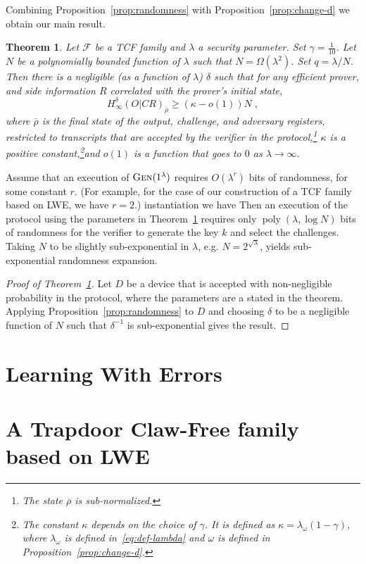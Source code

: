 \documentclass[11pt]{article}
\newtheorem{theorem}{Theorem}
\theoremstyle{remark}
\theoremstyle{definition}
\newcommand{\ol}[1]{\overline{#1}}
\DeclareMathOperator{\poly}{poly}
\newcommand{\Gen}{\textsc{Gen}}
\newcommand{\Hmin}{H_\infty}
\begin{document}
Combining Proposition~\ref{prop:randomness} with Proposition~\ref{prop:change-d} we obtain our main result.


\begin{theorem}\label{thm:expansion}
Let $\mathcal{F}$ be a TCF family and $\lambda$ a security parameter. Set $\gamma = \frac{1}{10}$. Let $N$ be a polynomially bounded function of $\lambda$ such that $N = \Omega(\lambda^2)$. Set $q = \lambda/N$. Then there is a negligible (as a function of $\lambda$) $\delta$ such that for any efficient prover, and side information $R$ correlated with the prover's initial state,
$$\Hmin^{\delta}(O|CR)_{\ol{\rho}} \geq  (\kappa-o(1)) N\;,$$
where $\ol{\rho}$ is the final state of the output, challenge, and adversary registers, restricted to transcripts that are accepted by the verifier in the protocol,\footnote{The state $\ol{\rho}$ is sub-normalized.} $\kappa$ is a positive constant,\footnote{The constant $\kappa$ depends on the choice of $\gamma$. It is defined as $\kappa =\lambda_\omega(1-\gamma)$, where $\lambda_\omega$ is defined in~\eqref{eq:def-lambda} and $\omega$ is defined in Proposition~\ref{prop:change-d}.}and $o(1)$ is a function that goes to $0$ as $\lambda\to\infty$. 
\end{theorem}

Assume that an execution of $\Gen(1^\lambda)$ requires $O(\lambda^r)$ bits of randomness, for some constant $r$. (For example, for the case of our construction of a TCF family based on LWE, we have $r=2$.) instantiation we have  Then an execution of the protocol using the parameters in Theorem~\ref{thm:expansion} requires only $\poly(\lambda,\log N)$ bits of randomness for the verifier to generate the key $k$ and select the challenges. Taking $N$ to be slightly sub-exponential in $\lambda$, e.g. $N=2^{\sqrt{\lambda}}$, yields sub-exponential randomness expansion. 

\begin{proof}[Proof of Theorem~\ref{thm:expansion}]
Let $D$ be a device that is accepted with non-negligible probability in the protocol, where the parameters are a stated in the theorem. Applying Proposition~\ref{prop:randomness} to $D$ and choosing $\delta$ to be a negligible function of $N$ such that $\delta^{-1}$ is sub-exponential gives the result. 
\end{proof}

\appendix

\section{Learning With Errors}
\label{sec:lweprelim}



\section{A Trapdoor Claw-Free family based on LWE}
\label{sec:lwetcf}





\notesendofpaper
\end{document}
